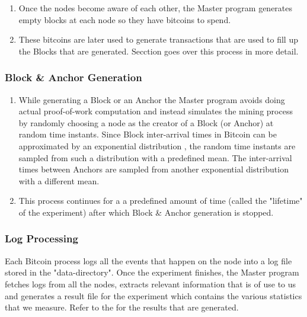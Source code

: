 
\begin{enumerate}
    \item Once the nodes become aware of each other, the Master program generates empty blocks at each node so they have bitcoins to spend.
    
    \item These bitcoins are later used to generate transactions that are used to fill up the Blocks that are generated.
          Secction  goes over this process in more detail.
\end{enumerate}

\subsubsection{Block \& Anchor Generation}

\begin{enumerate}
    \item While generating a Block or an Anchor the Master program avoids doing actual proof-of-work computation and instead simulates the mining process by randomly choosing a node as the creator of a Block (or Anchor) at random time instants.
    Since Block inter-arrival times in Bitcoin can be approximated by an exponential distribution \cite{bitcoinOriginal}, the random time instants are sampled from such a distribution with a predefined mean.
    The inter-arrival times between Anchors are sampled from another exponential distribution with a different mean.

    \item This process continues for a a predefined amount of time (called the "lifetime" of the experiment) after which Block \& Anchor generation is stopped.
\end{enumerate}

\subsubsection{Log Processing}

Each Bitcoin process logs all the events that happen on the node into a log file stored in the "data-directory".
Once the experiment finishes, the Master program fetches logs from all the nodes, extracts relevant information that is of use to us and generates a result file for the experiment which contains the various statistics that we measure. Refer to the  for the results that are generated.


